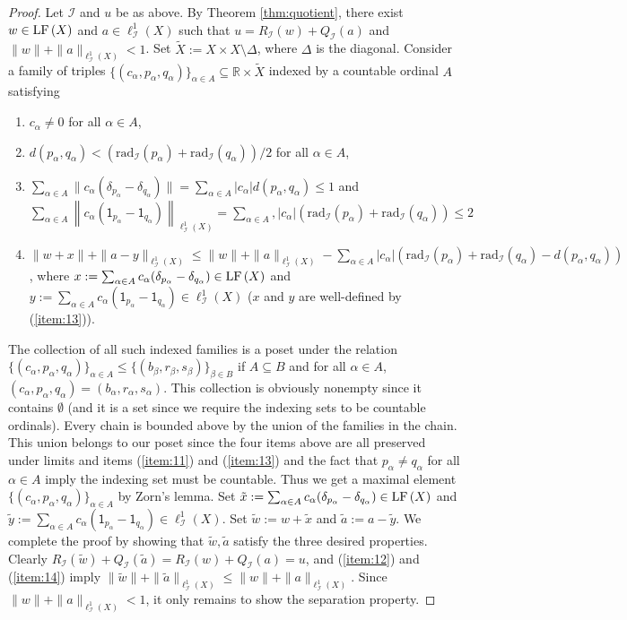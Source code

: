 \documentclass[12pt]{amsart}
\theoremstyle{definition}
\numberwithin{equation}{section}
\def \R {\mathbb{R}}
\def \I {\mathcal{I}}
\def \sbs {\subseteq}
\def \cross {\times}
\def \one {\mathsf{1}}
\renewcommand{\l}[2]{\ell^1_{#1}\left( #2 \right)}
\newcommand{\rad}[2]{\mathrm{rad}_{#1}\left(#2\right)}
\begin{document}
\begin{proof}
Let $\I$ and $u$ be as above. By Theorem \ref{thm:quotient}, there exist $w \in \LF{X}$ and $a \in \l{\I}{X}$ such that $u = R_\I(w) + Q_\I(a)$ and $\|w\|+\|a\|_{\l{\I}{X}} < 1$. Set $\tilde{X} := X \cross X \setminus \Delta$, where $\Delta$ is the diagonal. Consider a family of triples $\{(c_\alpha,p_\alpha,q_\alpha)\}_{\alpha \in A} \sbs \R \cross \tilde{X}$ indexed by a countable ordinal $A$ satisfying
\begin{enumerate}
\item \label{item:11} $c_\alpha \neq 0$ for all $\alpha \in A$,
\item \label{item:12} $d(p_\alpha,q_\alpha) < (\rad{\I}{p_\alpha}+\rad{\I}{q_\alpha})/2$ for all $\alpha \in A$,
\item \label{item:13} $\sum_{\alpha \in A} \|c_\alpha(\delta_{p_\alpha}-\delta_{q_\alpha})\| = \sum_{\alpha \in A} |c_\alpha|d(p_\alpha,q_\alpha) \leq 1$ and \\ $\sum_{\alpha \in A} \left\|c_\alpha(\one_{p_\alpha}-\one_{q_\alpha})\right\|_{\l{\I}{X}} = \sum_{\alpha \in A}, |c_\alpha|(\rad{\I}{p_\alpha}+\rad{\I}{q_\alpha}) \leq 2$
\item \label{item:14} $\|w+x\| + \|a-y\|_{\l{\I}{X}} \leq \|w\| + \|a\|_{\l{\I}{X}} - \sum_{\alpha \in A} |c_\alpha|(\rad{\I}{p_\alpha}+\rad{\I}{q_\alpha}-d(p_\alpha,q_\alpha))$, where $x := \sum_{\alpha \in A}c_\alpha(\delta_{p_\alpha}-\delta_{q_\alpha}) \in \LF{X}$ and $y := \sum_{\alpha \in A} c_\alpha(\one_{p_\alpha}-\one_{q_\alpha}) \in \l{\I}{X}$ ($x$ and $y$ are well-defined by (\ref{item:13})).
\end{enumerate}

The collection of all such indexed families is a poset under the relation $\{(c_\alpha,p_\alpha,q_\alpha)\}_{\alpha \in A} \leq \{(b_\beta,r_\beta,s_\beta)\}_{\beta \in B}$ if $A \sbs B$ and for all $\alpha \in A$, $(c_\alpha,p_\alpha,q_\alpha) = (b_\alpha,r_\alpha,s_\alpha)$. This collection is obviously nonempty since it contains $\emptyset$ (and it is a set since we require the indexing sets to be countable ordinals). Every chain is bounded above by the union of the families in the chain. This union belongs to our poset since the four items above are all preserved under limits and items (\ref{item:11}) and (\ref{item:13}) and the fact that $p_\alpha \neq q_\alpha$ for all $\alpha \in A$ imply the indexing set must be countable. Thus we get a maximal element $\{(c_\alpha,p_\alpha,q_\alpha)\}_{\alpha \in A}$ by Zorn's lemma. Set $\tilde{x} := \sum_{\alpha \in A}c_\alpha(\delta_{p_\alpha}-\delta_{q_\alpha}) \in \LF{X}$ and $\tilde{y} := \sum_{\alpha \in A} c_\alpha(\one_{p_\alpha}-\one_{q_\alpha}) \in \l{\I}{X}$. Set $\tilde{w} := w + \tilde{x}$ and $\tilde{a} := a - \tilde{y}$. We complete the proof by showing that $\tilde{w},\tilde{a}$ satisfy the three desired properties. Clearly $R_\I(\tilde{w}) + Q_\I(\tilde{a}) = R_\I(w) + Q_\I(a) = u$, and (\ref{item:12}) and (\ref{item:14}) imply $\|\tilde{w}\|+\|\tilde{a}\|_{\l{\I}{X}} \leq \|w\|+\|a\|_{\l{\I}{X}}$. Since $\|w\|+\|a\|_{\l{\I}{X}} < 1$, it only remains to show the separation property.


\end{proof}
\end{document}
